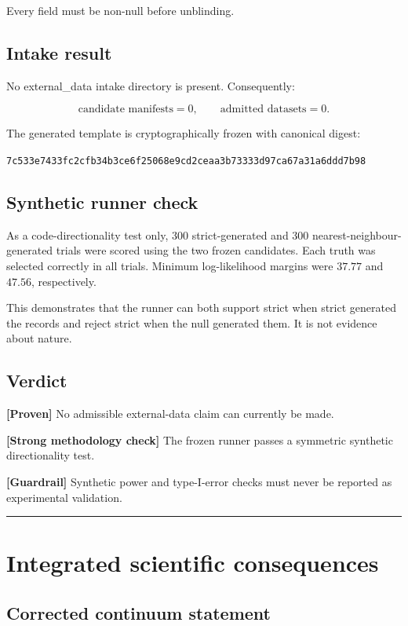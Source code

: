 \documentclass[11pt,a4paper,openany]{report}
\newcommand{\statusProven}{\textcolor{fingreen}{[Proven]}}
\begin{document}
Every field must be non-null before unblinding.

\section{Intake result}

No external\_data intake directory is present. Consequently:

\[
\text{candidate manifests}=0,
\qquad
\text{admitted datasets}=0.
\]

The generated template is cryptographically frozen with canonical digest:

\texttt{7c533e7433fc2cfb}\allowbreak\texttt{34b3ce6f25068e9c}\allowbreak\texttt{d2ceaa3b73333d97}\allowbreak\texttt{ca67a31a6ddd7b98}

\section{Synthetic runner check}

As a code-directionality test only, 300 strict-generated and 300 nearest-neighbour-generated trials were scored using the two frozen candidates. Each truth was selected correctly in all trials. Minimum log-likelihood margins were \(37.77\) and \(47.56\), respectively.

This demonstrates that the runner can both support strict when strict generated the records and reject strict when the null generated them. It is not evidence about nature.

\section{Verdict}

\textbf{\statusProven{}} No admissible external-data claim can currently be made.

\textbf{[Strong methodology check]} The frozen runner passes a symmetric synthetic directionality test.

\textbf{[Guardrail]} Synthetic power and type-I-error checks must never be reported as experimental validation.

\par\medskip\hrule\medskip

\chapter{Integrated scientific consequences}

\section{Corrected continuum statement}
\end{document}
